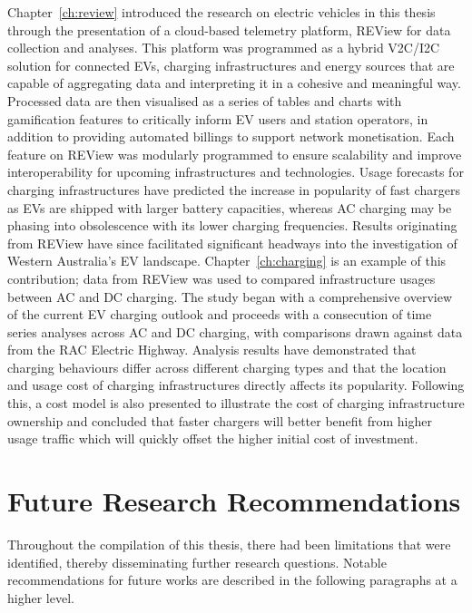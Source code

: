 Chapter~\ref{ch:review} introduced the research on electric vehicles in this thesis through the presentation of a cloud-based telemetry platform, REView for data collection and analyses. This platform was programmed as a hybrid V2C/I2C solution for connected EVs, charging infrastructures and energy sources that are capable of aggregating data and interpreting it in a cohesive and meaningful way. Processed data are then visualised as a series of tables and charts with gamification features to critically inform EV users and station operators, in addition to providing automated billings to support network monetisation. Each feature on REView was modularly programmed to ensure scalability and improve interoperability for upcoming infrastructures and technologies. Usage forecasts for charging infrastructures have predicted the increase in popularity of fast chargers as EVs are shipped with larger battery capacities, whereas AC charging may be phasing into obsolescence with its lower charging frequencies. Results originating from REView have since facilitated significant headways into the investigation of Western Australia's EV landscape. Chapter~\ref{ch:charging} is an example of this contribution; data from REView was used to compared infrastructure usages between AC and DC charging. The study began with a comprehensive overview of the current EV charging outlook and proceeds with a consecution of time series analyses across AC and DC charging, with comparisons drawn against data from the RAC Electric Highway. Analysis results have demonstrated that charging behaviours differ across different charging types and that the location and usage cost of charging infrastructures directly affects its popularity. Following this, a cost model is also presented to illustrate the cost of charging infrastructure ownership and concluded that faster chargers will better benefit from higher usage traffic which will quickly offset the higher initial cost of investment.

\section{Future Research Recommendations}
Throughout the compilation of this thesis, there had been limitations that were identified, thereby disseminating further research questions. Notable recommendations for future works are described in the following paragraphs at a higher level.

